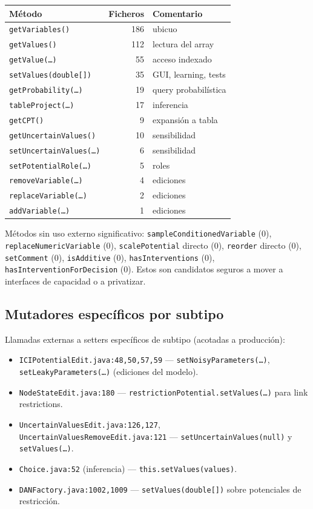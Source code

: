 \documentclass[11pt,a4paper]{article}
\newcommand{\code}[1]{\texttt{#1}}
\begin{document}
\begin{center}
\begin{tabular}{lrl}
\toprule
\textbf{Método} & \textbf{Ficheros} & \textbf{Comentario} \\
\midrule
\code{getVariables()}       & 186 & ubicuo \\
\code{getValues()}          & 112 & lectura del array \\
\code{getValue(\dots)}      &  55 & acceso indexado \\
\code{setValues(double[])}  &  35 & GUI, learning, tests \\
\code{getProbability(\dots)}&  19 & query probabilística \\
\code{tableProject(\dots)}  &  17 & inferencia \\
\code{getCPT()}             &   9 & expansión a tabla \\
\code{getUncertainValues()} &  10 & sensibilidad \\
\code{setUncertainValues(\dots)} &  6 & sensibilidad \\
\code{setPotentialRole(\dots)}    &  5 & roles \\
\code{removeVariable(\dots)}      &  4 & ediciones \\
\code{replaceVariable(\dots)}     &  2 & ediciones \\
\code{addVariable(\dots)}         &  1 & ediciones \\
\bottomrule
\end{tabular}
\end{center}

Métodos sin uso externo significativo:
\code{sampleConditionedVariable} (0), \code{replaceNumericVariable} (0),
\code{scalePotential} directo (0), \code{reorder} directo (0),
\code{setComment} (0), \code{isAdditive} (0), \code{hasInterventions} (0),
\code{hasInterventionForDecision} (0). Estos son candidatos seguros a mover
a interfaces de capacidad o a privatizar.

\subsection{Mutadores específicos por subtipo}

Llamadas externas a setters específicos de subtipo (acotadas a producción):

\begin{itemize}[leftmargin=*]
  \item \code{ICIPotentialEdit.java:48,50,57,59} ---
        \code{setNoisyParameters(\dots)}, \code{setLeakyParameters(\dots)}
        (ediciones del modelo).
  \item \code{NodeStateEdit.java:180} ---
        \code{restrictionPotential.setValues(\dots)} para link restrictions.
  \item \code{UncertainValuesEdit.java:126,127},
        \code{UncertainValuesRemoveEdit.java:121} ---
        \code{setUncertainValues(null)} y \code{setValues(\dots)}.
  \item \code{Choice.java:52} (inferencia) --- \code{this.setValues(values)}.
  \item \code{DANFactory.java:1002,1009} ---
        \code{setValues(double[])} sobre potenciales de restricción.
\end{itemize}
\end{document}
